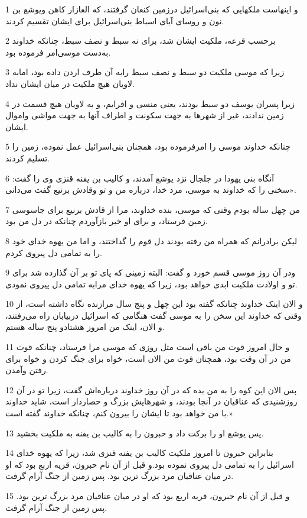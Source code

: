 \par 1 و اینهاست ملکهایی که بنی‌اسرائیل درزمین کنعان گرفتند، که العازار کاهن ویوشع بن نون و روسای آبای اسباط بنی‌اسرائیل برای ایشان تقسیم کردند.
\par 2 برحسب قرعه، ملکیت ایشان شد، برای نه سبط و نصف سبط، چنانکه خداوند به‌دست موسی‌امر فرموده بود.
\par 3 زیرا که موسی ملکیت دو سبط و نصف سبط رابه آن طرف اردن داده بود، امابه لاویان هیچ ملکیت در میان ایشان نداد.
\par 4 زیرا پسران یوسف دو سبط بودند، یعنی منسی و افرایم، و به لاویان هیچ قسمت در زمین ندادند، غیر از شهرها به جهت سکونت و اطراف آنها به جهت مواشی واموال ایشان.
\par 5 چنانکه خداوند موسی را امرفرموده بود، همچنان بنی‌اسرائیل عمل نموده، زمین را تسلیم کردند.
\par 6 آنگاه بنی یهودا در جلجال نزد یوشع آمدند، و کالیب بن یفنه قنزی وی را گفت: «سخنی را که خداوند به موسی، مرد خدا، درباره من و تو وقادش برنیع گفت می‌دانی.
\par 7 من چهل ساله بودم وقتی که موسی، بنده خداوند، مرا از قادش برنیع برای جاسوسی زمین فرستاد، و برای او خبر بازآوردم چنانکه در دل من بود.
\par 8 لیکن برادرانم که همراه من رفته بودند دل قوم را گداختند، و اما من یهوه خدای خود را به تمامی دل پیروی کردم.
\par 9 ودر آن روز موسی قسم خورد و گفت: البته زمینی که پای تو بر آن گذارده شد برای تو و اولادت ملکیت ابدی خواهد بود، زیرا که یهوه خدای مرابه تمامی دل پیروی نمودی.
\par 10 و الان اینک خداوند چنانکه گفته بود این چهل و پنج سال مرازنده نگاه داشته است، از وقتی که خداوند این سخن را به موسی گفت هنگامی که اسرائیل دربیابان راه می‌رفتند، و الان، اینک من امروز هشتادو پنج ساله هستم.
\par 11 و حال امروز قوت من باقی است مثل روزی که موسی مرا فرستاد، چنانکه قوت من در آن وقت بود، همچنان قوت من الان است، خواه برای جنگ کردن و خواه برای رفتن وآمدن.
\par 12 پس الان این کوه را به من بده که در آن روز خداوند درباره‌اش گفت، زیرا تو در آن روزشنیدی که عناقیان در آنجا بودند، و شهرهایش بزرگ و حصاردار است، شاید خداوند با من خواهد بود تا ایشان را بیرون کنم، چنانکه خداوند گفته است.»
\par 13 پس یوشع او را برکت داد و حبرون را به کالیب بن یفنه به ملکیت بخشید.
\par 14 بنابراین حبرون تا امروز ملکیت کالیب بن یفنه قنزی شد، زیرا که یهوه خدای اسرائیل را به تمامی دل پیروی نموده بود.و قبل از آن نام حبرون، قریه اربع بود که او در میان عناقیان مرد بزرگ ترین بود. پس زمین از جنگ آرام گرفت.
\par 15 و قبل از آن نام حبرون، قریه اربع بود که او در میان عناقیان مرد بزرگ ترین بود. پس زمین از جنگ آرام گرفت.
 
